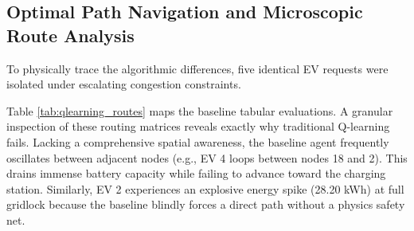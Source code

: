 \documentclass[journal, a4paper, twocolumn]{IEEEtran}
\begin{document}
\subsection{Optimal Path Navigation and Microscopic Route Analysis}
To physically trace the algorithmic differences, five identical EV requests were isolated under escalating congestion constraints. 

\begin{table}[htbp]
\centering
\caption{Tabular Q-Learning Evaluated Routes (Baseline)}
\label{tab:qlearning_routes}
\end{table}

Table \ref{tab:qlearning_routes} maps the baseline tabular evaluations. A granular inspection of these routing matrices reveals exactly why traditional Q-learning fails. Lacking a comprehensive spatial awareness, the baseline agent frequently oscillates between adjacent nodes (e.g., EV 4 loops between nodes 18 and 2). This drains immense battery capacity while failing to advance toward the charging station. Similarly, EV 2 experiences an explosive energy spike (28.20 kWh) at full gridlock because the baseline blindly forces a direct path without a physics safety net.
\end{document}
